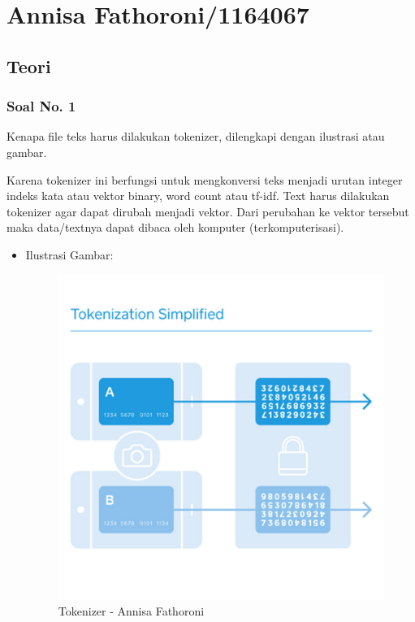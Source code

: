 \section{Annisa Fathoroni/1164067}
\subsection{Teori}
\subsubsection{Soal No. 1}
Kenapa file teks harus dilakukan tokenizer, dilengkapi dengan ilustrasi atau gambar.

Karena tokenizer ini berfungsi untuk mengkonversi teks menjadi urutan integer indeks kata atau vektor binary, word count atau tf-idf. Text harus dilakukan tokenizer agar dapat dirubah menjadi vektor. Dari perubahan ke vektor tersebut maka data/textnya dapat dibaca oleh komputer (terkomputerisasi).

\begin{itemize}
\item Ilustrasi Gambar:

\begin{figure}[!hbtp]
\centering
\includegraphics[scale=0.2]{figures/Chapter 7/1164067/Teori/Chapter7AnnisaFathoroni1.jpg}
\caption{Tokenizer - Annisa Fathoroni}
\label{Tokenizer - Annisa Fathoroni}
\end{figure}

\end{itemize}

